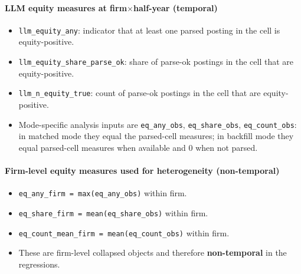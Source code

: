 \documentclass{article}
\begin{document}
\paragraph{LLM equity measures at firm$\times$half-year (temporal)}
\begin{itemize}
  \item \texttt{llm\_equity\_any}: indicator that at least one parsed posting in the cell is equity-positive.
  \item \texttt{llm\_equity\_share\_parse\_ok}: share of parse-ok postings in the cell that are equity-positive.
  \item \texttt{llm\_n\_equity\_true}: count of parse-ok postings in the cell that are equity-positive.
  \item Mode-specific analysis inputs are \texttt{eq\_any\_obs}, \texttt{eq\_share\_obs}, \texttt{eq\_count\_obs}: in matched mode they equal the parsed-cell measures; in backfill mode they equal parsed-cell measures when available and 0 when not parsed.
\end{itemize}

\paragraph{Firm-level equity measures used for heterogeneity (non-temporal)}
\begin{itemize}
  \item \texttt{eq\_any\_firm = max(eq\_any\_obs)} within firm.
  \item \texttt{eq\_share\_firm = mean(eq\_share\_obs)} within firm.
  \item \texttt{eq\_count\_mean\_firm = mean(eq\_count\_obs)} within firm.
  \item These are firm-level collapsed objects and therefore \textbf{non-temporal} in the regressions.
\end{itemize}
\end{document}
